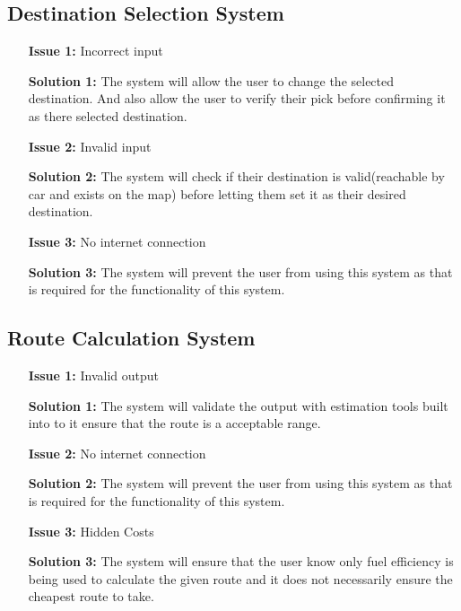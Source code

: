 \documentclass{article}
\begin{document}
\subsection{Destination Selection System}
\begin{itemize}
	\item[\textbf{Issue 1:}] Incorrect input
	\item[\textbf{Solution 1:}] The system will allow the user to change the selected destination. And also allow the user to verify their pick 
	before confirming it as there selected destination.
	\item[\textbf{Issue 2:}] Invalid input
	\item[\textbf{Solution 2:}] The system will check if their destination is valid(reachable by car and exists on the map) before letting them set it as their desired destination.
	\item[\textbf{Issue 3:}] No internet connection
	\item[\textbf{Solution 3:}] The system will prevent the user from using this system as that is required for the functionality of this system.
\end{itemize}

\subsection{Route Calculation System}
\begin{itemize}
	\item[\textbf{Issue 1:}] Invalid output
	\item[\textbf{Solution 1:}] The system will validate the output with estimation tools built into to it ensure that the route is a acceptable range.
	\item[\textbf{Issue 2:}] No internet connection
	\item[\textbf{Solution 2:}] The system will prevent the user from using this system as that is required for the functionality of this system.
	\item[\textbf{Issue 3:}] Hidden Costs
	\item[\textbf{Solution 3:}] The system will ensure that the user know only fuel efficiency is being used to calculate the given route and it does 
	not necessarily ensure the cheapest route to take.
\end{itemize}
\end{document}
